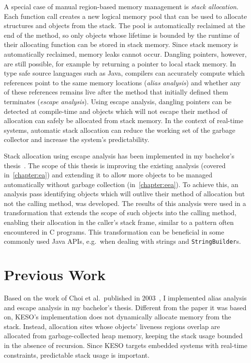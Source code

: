 		A special case of manual region-based memory management is \emph{stack allocation}. Each function call creates a new
		logical memory pool that can be used to allocate structures and objects from the stack. The pool is automatically
		reclaimed at the end of the method, so only objects whose lifetime is bounded by the runtime of their allocating
		function can be stored in stack memory. Since stack memory is automatically reclaimed, memory leaks cannot occur.
		Dangling pointers, however, are still possible, for example by returning a pointer to local stack memory. In type
		safe source languages such as Java, compilers can accurately compute which references point to the same memory
		locations (\emph{alias analysis}) and whether any of these references remains live after the method that initially
		defined them terminates (\emph{escape analysis}). Using escape analysis, dangling pointers can be detected at
		compile-time and objects which will not escape their method of allocation can safely be allocated from stack memory.
		In the context of real-time systems, automatic stack allocation can reduce the working set of the garbage collector
		and increase the system's predictability.

		Stack allocation using escape analysis has been implemented in my bachelor's thesis~\cite{lang:12}. The scope of
		this thesis is improving the existing analysis (covered in~\cref{chapter:ea}) and extending it to allow more objects
		to be managed automatically without garbage collection (in~\cref{chapter:eea}). To achieve this, an analysis pass
		identifying objects which will outlive their method of allocation but not the calling method, was developed. The
		results of this analysis were used in a transformation that extends the scope of such objects into the calling
		method, enabling their allocation in the caller's stack frame, similar to a pattern often encountered in C programs.
		This transformation can be beneficial in some commonly used Java APIs, e.g.\ when dealing with strings and
		\texttt{StringBuilder}s.

	\section{Previous Work}
		\label{sec:intro:prev}
		Based on the work of Choi et al.\ published in 2003~\cite{choi:03}, I implemented alias analysis and escape analysis
		in my bachelor's thesis. Different from the paper it was based on, KESO's implementation does not dynamically
		allocate memory from the stack. Instead, allocation sites whose objects' liveness regions overlap are allocated from
		garbage-collected heap memory, keeping the stack usage bounded in the absence of recursion. Since KESO targets
		embedded systems with real-time constraints, predictable stack usage is important.

